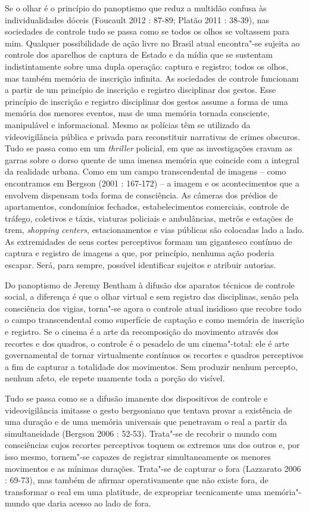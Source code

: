Se o olhar é o princípio do panoptismo que reduz a multidão confusa às
individualidades dóceis (Foucault 2012 : 87-89; Platão 2011 : 38-39),
nas sociedades de controle tudo se passa como se todos os olhos se
voltassem para mim. Qualquer possibilidade de ação livre no Brasil atual
encontra"-se sujeita ao controle dos aparelhos de captura de Estado e da
mídia que se sustentam indistintamente sobre uma dupla operação: captura
e registro; todos os olhos, mas também memória de inscrição infinita. As
sociedades de controle funcionam a partir de um princípio de inscrição e
registro disciplinar dos gestos. Esse princípio de inscrição e registro
disciplinar dos gestos assume a forma de uma memória dos menores
eventos, mas de uma memória tornada consciente, manipulável e
informacional. Mesmo as polícias têm se utilizado da vídeovigilância
pública e privada para reconstituir narrativas de crimes obscuros. Tudo
se passa como em um \emph{thriller }policial, em que as investigações
cravam as garras sobre o dorso quente de uma imensa memória que coincide
com a integral da realidade urbana. Como em um campo transcendental de
imagens -- como encontramos em Bergson (2001 : 167-172) -- a imagem e os
acontecimentos que a envolvem dispensam toda forma de consciência. As
câmeras dos prédios de apartamentos, condomínios fechados,
estabelecimentos comerciais, controle de tráfego, coletivos e táxis,
viaturas policiais e ambulâncias, metrôs e estações de trem,
\emph{shopping centers}, estacionamentos e vias públicas são colocadas
lado a lado. As extremidades de seus cortes perceptivos formam um
gigantesco contínuo de captura e registro de imagens a que, por
princípio, nenhuma ação poderia escapar. Será, para sempre, possível
identificar sujeitos e atribuir autorias.

Do panoptismo de Jeremy Bentham à difusão dos aparatos técnicos de
controle social, a diferença é que o olhar virtual e sem registro das
disciplinas, senão pela consciência dos vigias, torna"-se agora o
controle atual insidioso que recobre todo o campo transcendental como
superfície de captação e como memória de inscrição e registro. Se o
cinema é a arte da recomposição do movimento através dos recortes e dos
quadros, o controle é o pesadelo de um cinema"-total: ele é arte
governamental de tornar virtualmente contínuos os recortes e quadros
perceptivos a fim de capturar a totalidade dos movimentos. Sem produzir
nenhum percepto, nenhum afeto, ele repete nuamente toda a porção do
visível.

Tudo se passa como se a difusão imanente dos dispositivos de controle e
videovigilância imitasse o gesto bergsoniano que tentava provar a
existência de uma duração e de uma memória universais que penetravam o
real a partir da simultaneidade (Bergson 2006 : 52-53). Trata"-se de
recobrir o mundo com consciências cujos recortes perceptivos toquem os
extremos uns dos outros e, por isso mesmo, tornem"-se capazes de
registrar simultaneamente os menores movimentos e as mínimas durações.
Trata"-se de capturar o fora (Lazzarato 2006 : 69-73), mas também de
afirmar operativamente que não existe fora, de transformar o real em uma
platitude, de expropriar tecnicamente uma memória"-mundo que daria acesso
ao lado de fora.

